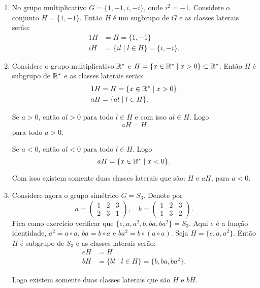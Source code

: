 \begin{exemplos}
    \begin{enumerate}[label={\arabic*})]
        \item No grupo multiplicativo $G = \{1, -1, i, -i\}$, onde $i^2 = -1$. Considere o conjunto $H = \{1, -1\}$. Então $H$ é um sugbrupo de $G$ e as classes laterais serão:
        \begin{align*}
            1H &= H = \{1, -1\}\\
            iH &= \{il \mid l \in H\} = \{i, -i\}.
        \end{align*}

        \item Considere o grupo multiplicativo $\mathbb{R}^*$ e $H = \{ x \in \mathbb{R}^* \mid x > 0\} \subset \mathbb{R}^*$. Então $H$ é subgrupo de $\mathbb{R}^*$ e as classes laterais serão:
        \begin{align*}
            1H &= H = \{x \in \mathbb{R}^* \mid x > 0\}\\
            aH &= \{al \mid l \in H\}.
        \end{align*}

        Se $a > 0$, então $al > 0$ para todo $l \in H$ e com isso $al \in H$. Logo
        \[
            aH = H
        \]
        para todo $a > 0$.

        Se $a < 0$, então $al < 0$ para todo $l \in H$. Logo
        \[
            aH = \{x \in \mathbb{R}^* \mid x < 0\}.
        \]

        Com isso existem somente duas classes laterais que são: $H$ e $aH$, para $a < 0$.

        \item Considere agora o grupo simétrico $G = S_3$. Denote por
        \[
            a = \begin{pmatrix}
                    1 & 2 & 3\\2 & 3 & 1
                \end{pmatrix}, \quad
            b = \begin{pmatrix}
                    1 & 2 & 3\\1 & 3 & 2
                \end{pmatrix}.
        \]
        Fica como exercício verificar que $\{e, a, a^2 , b, ba, ba^2\} = S_3$. Aqui $e$ é a função identidade, $a^2 = a \circ a$, $ba = b \circ a$ e $ba^2 = b\circ(a\circ a)$. Seja $H = \{e, a , a^2\}$. Então $H$ é subgrupo de $S_3$ e as classes laterais serão:
        \begin{align*}
            eH &= H\\
            bH &= \{bl \mid l \in H\} = \{b, ba, ba^2\}.
        \end{align*}

        Logo existem somente duas classes laterais que são $H$ e $bH$.
    \end{enumerate}
\end{exemplos}

